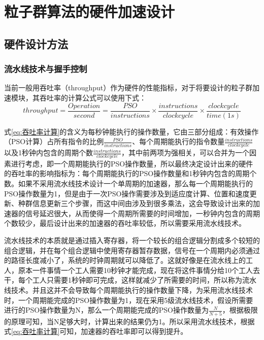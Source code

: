 \chapter{粒子群算法的硬件加速设计}
\section{硬件设计方法}
\subsection{流水线技术与握手控制}
当前一般用吞吐率（throughput）作为硬件的性能指标，对于将要设计的粒子群加速模块，其吞吐率的计算公式可以使用下式：
\begin{equation}\label{eq:吞吐率计算}
    throughput = \frac{Operation}{second}=\frac{PSO}{instructions}\times \frac{instructions}{clock cycle} \times \frac{clock cycle}{time(1s)}
    \end{equation}

式\eqref{eq:吞吐率计算}的含义为每秒钟能执行的操作数量，它由三部分组成：有效操作（PSO计算）占所有指令的比例$\frac{PSO}{instructions}$、每个周期能执行的指令数量$\frac{instructions}{clock cycle}$以及1秒钟内包含的周期个数$\frac{instructions}{clock cycle}$，其中前两项为强相关，可以合并为一个因素进行考虑，即一个周期能执行的PSO操作数量，所以最终决定设计出来的硬件的吞吐率的影响指标为：每个周期能执行的PSO操作数量和1秒钟内包含的周期个数。如果不采用流水线技术设计一个单周期的加速器，那么每一个周期能执行的PSO操作数量为1，但是由于一次PSO操作需要涉及到适应度计算、位置和速度更新、种群信息更新三个步骤，而这中间由涉及到很多乘法，这会导致设计出来的加速器的信号延迟很大，从而使得一个周期所需要的时间增加，一秒钟内包含的周期个数较少，最后设计出来的加速器的吞吐率较低，所以需要采用流水线技术。

流水线技术的本质就是通过插入寄存器，将一个较长的组合逻辑分割成多个较短的组合逻辑，并在每个组合逻辑中使用寄存器暂存数据，信号在一个周期内必须通过的路径长度减小了，系统的时钟周期就可以降低了。这就好像是在流水线上的工人，原本一件事情一个工人需要10秒钟才能完成，现在将这件事情分给10个工人去干，每个工人只需要1秒钟即可完成，这样就减少了所需要的时间，所以称为流水线技术。并且这并不会导致每个周期能执行的操作数量下降，为采用流水线技术时，一个周期能完成的PSO操作数量为1，现在采用5级流水线技术，假设所需要进行的PSO操作数量为N，那么一个周期能完成的PSO操作数量为$\frac{N}{N+5}$，根据极限的原理可知，当N足够大时，计算出来的结果仍为1。所以采用流水线技术，根据式\eqref{eq:吞吐率计算}可知，加速器的吞吐率即可以得到提升。